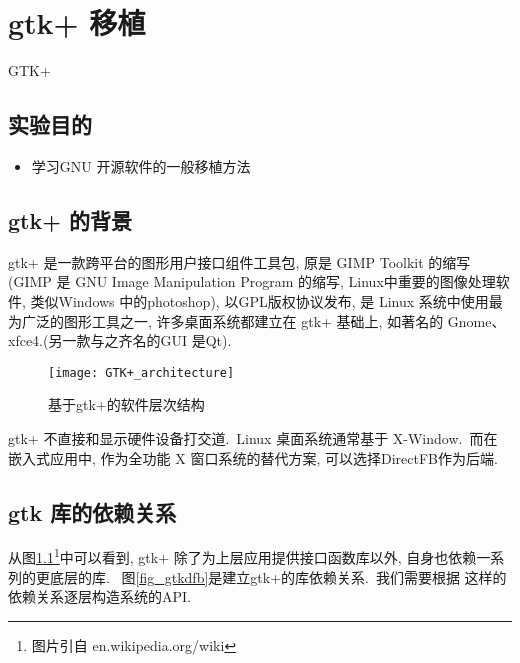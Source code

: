 \chapter{gtk+ 移植}{GTK+}

\section{实验目的}
\begin{itemize}\itemsep=-3pt
  \item 学习GNU 开源软件的一般移植方法
\end{itemize}

\section{gtk+ 的背景}
    gtk+ 是一款跨平台的图形用户接口组件工具包, 原是 GIMP Toolkit 的缩写(GIMP 是
GNU Image Manipulation Program 的缩写, Linux中重要的图像处理软件, 类似Windows
中的photoshop), 以GPL版权协议发布, 是 Linux 系统中使用最为广泛的图形工具之一,
许多桌面系统都建立在 gtk+ 基础上, 如著名的 Gnome、xfce4.(另一款与之齐名的GUI
是Qt).

\begin{figure}[h]
  \centering
  \texttt{[image: GTK+\_architecture]}
  \caption{基于gtk+的软件层次结构}\label{fig_gtk}
\end{figure}

    gtk+ 不直接和显示硬件设备打交道.~Linux 桌面系统通常基于 X-Window.~而在
嵌入式应用中, 作为全功能 X 窗口系统的替代方案, 可以选择DirectFB作为后端. 

\section{gtk 库的依赖关系}
从图\ref{fig_gtk}\footnote{图片引自 en.wikipedia.org/wiki}中可以看到, 
gtk+ 除了为上层应用提供接口函数库以外, 自身也依赖一系列的更底层的库.~
图\ref{fig_gtkdfb}是建立gtk+的库依赖关系.~我们需要根据
这样的依赖关系逐层构造系统的API.

